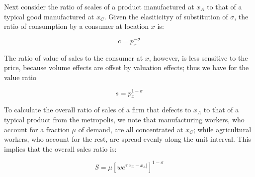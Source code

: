 Next consider the ratio of scales of a product manufactured at $x_A$ to that of a typical good manufactured at $x_C$. Given the elasiticityy of substitution of $\sigma$, the ratio of consumption by a consumer at location $x$ is:

\begin{equation}
    c = p_x^{-\sigma}
\end{equation}

The ratio of value of sales to the consumer at $x$, however, is less sensitive to the price, because volume effects are offset by valuation effects; thus we have for the value ratio

\begin{equation}
    s = p_x^{1 - \sigma}
\end{equation}

To calculate the overall ratio of sales of a firm that defects to $x_A$ to that of a typical product from the metropolis, we note that manufacturing workers, who account for a fraction $\mu$ of demand, are all concentrated at $x_C$; while agricultural workers, who account for the rest, are spread evenly along the unit interval. This implies that the overall sales ratio is:

\begin{equation}
    S = \mu [we^{\tau |x_C - x_A|}]^{1 - \sigma}
\end{equation}
 
